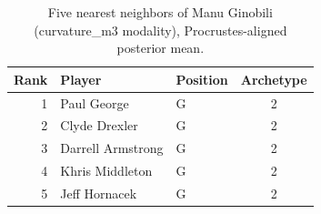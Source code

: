 \begin{table}[htbp]
  \centering\small
  \begin{tabular}{rllc}
    \toprule
    Rank & Player & Position & Archetype \\
    \midrule
    1 & Paul George & G & 2 \\
    2 & Clyde Drexler & G & 2 \\
    3 & Darrell Armstrong & G & 2 \\
    4 & Khris Middleton & G & 2 \\
    5 & Jeff Hornacek & G & 2 \\
    \bottomrule
  \end{tabular}
  \caption{Five nearest neighbors of Manu Ginobili (curvature_m3 modality), Procrustes-aligned posterior mean.}
  \label{tab:Manu_Ginobili_neighbors_curvature_m3}
\end{table}

